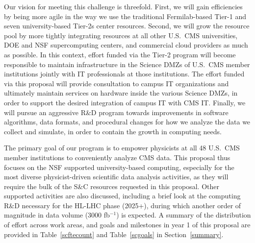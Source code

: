 \documentclass[11pt,a4paper]{article}
\begin{document}
Our vision for meeting this challenge 
is threefold. First, we will gain efficiencies by being  more
agile in the way we use the traditional Fermilab-based Tier-1 and seven
university-based Tier-2s center resources. Second, we will grow the
resource pool by more tightly integrating resources at all other
U.S.~CMS universities, DOE and NSF supercomputing centers, and
commercial cloud providers as much as possible. 
In this
context, effort funded via the Tier-2 program will become responsible to
maintain infrastructure in the Science DMZs of U.S.~CMS member institutions
jointly with IT professionals at those institutions.  The effort funded via
this proposal will provide consultation to campus IT organizations and
ultimately maintain services on hardware inside the various Science DMZs,
in order to support the desired integration of campus IT with CMS IT.
Finally, we will
pursue an aggressive R\&D program towards improvements in software
algorithms, data formats, and procedural changes for how we analyze
the data we collect and simulate, in order to contain the growth in
computing needs.





The primary goal of our program is to empower physicists at all 48 U.S.~CMS
member institutions to conveniently analyze CMS data. 
This proposal thus focuses on the NSF supported university-based computing,
especially for the most diverse %
physicist-driven scientific data analysis activities, as they will require
the bulk of the S\&C resources requested in this proposal.  Other supported
activities are also discussed, including a brief look at the
computing R\&D necessary for the HL-LHC phase (2025+), during which another
order of magnitude in data volume (3000 fb$^{-1}$) is expected.
A summary of the distribution of effort across work areas, and goals and milestones in year 1 of this proposal
are provided in Table~\ref{scftecount} and Table~\ref{scgoals} in Section~\ref{summary}.
\end{document}
